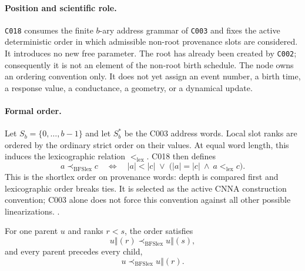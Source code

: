 
\paragraph*{Position and scientific role.}
\texttt{C018} consumes the finite $b$-ary address grammar of \texttt{C003} and
fixes the active deterministic order in which admissible non-root provenance
slots are considered.  It introduces no new free parameter.  The root has
already been created by \texttt{C002}; consequently it is not an element of
the non-root birth schedule.  The node owns an ordering convention only.  It
does not yet assign an event number, a birth time, a response value, a
conductance, a geometry, or a dynamical update.

\paragraph*{Formal order.}
Let $S_b=\{0,\ldots,b-1\}$ and let $S_b^*$ be the C003 address words.  Local
slot ranks are ordered by the ordinary strict order on their values.  At equal
word length, this induces the lexicographic relation $<_{\mathrm{lex}}$.
C018 then defines
\begin{equation}
  a \prec_{\mathrm{BFSlex}} c
  \quad\Longleftrightarrow\quad
  |a|<|c|
  \;\lor\;
  \bigl(|a|=|c|\ \land\ a<_{\mathrm{lex}}c\bigr).
  \label{eq:c018-bfslex}
\end{equation}
This is the shortlex order on provenance words: depth is compared first and
lexicographic order breaks ties.  It is selected as the active CNNA
construction convention; C003 alone does not force this convention against
all other possible linearizations.
\cite[Ch.~1, finite words and lexicographic order]{Lothaire1997CombinatoricsWords}.

For one parent $u$ and ranks $r<s$, the order satisfies
\begin{equation}
  u\mathbin{\Vert}(r) \prec_{\mathrm{BFSlex}}
  u\mathbin{\Vert}(s),
  \label{eq:c018-sibling-order}
\end{equation}
and every parent precedes every child,
\begin{equation}
  u \prec_{\mathrm{BFSlex}} u\mathbin{\Vert}(r).
  \label{eq:c018-parent-child}
\end{equation}

